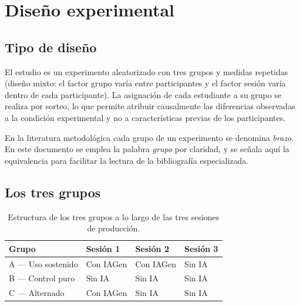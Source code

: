 \documentclass[12pt,a4paper,openany]{report}
\begin{document}
    \chapter{Dise\~no experimental}
    \label{cap:diseno}
    
    \section{Tipo de dise\~no}
    
    El estudio es un experimento aleatorizado con tres grupos y medidas repetidas (dise\~no mixto: el factor grupo var\'ia entre participantes y el factor sesi\'on var\'ia dentro de cada participante). La asignaci\'on de cada estudiante a su grupo se realiza por sorteo, lo que permite atribuir causalmente las diferencias observadas a la condici\'on experimental y no a caracter\'isticas previas de los participantes.
    
    En la literatura metodol\'ogica cada grupo de un experimento se denomina \emph{brazo}. En este documento se emplea la palabra \emph{grupo} por claridad, y se se\~nala aqu\'i la equivalencia para facilitar la lectura de la bibliograf\'ia especializada.
    
    \section{Los tres grupos}
    
    \begin{table}[htbp]
        \centering
        \caption{Estructura de los tres grupos a lo largo de las tres sesiones de producci\'on.}
        \label{tab:grupos}
        \small
        \begin{tabular}{L{3.4cm} C{2.7cm} C{2.7cm} C{2.7cm}}
            \toprule
            \textbf{Grupo} & \textbf{Sesi\'on 1} & \textbf{Sesi\'on 2} & \textbf{Sesi\'on 3} \\
            \midrule
            A --- Uso sostenido & Con IAGen & Con IAGen & Sin IA \\
            B --- Control puro  & Sin IA    & Sin IA    & Sin IA \\
            C --- Alternado     & Con IAGen & Sin IA    & Sin IA \\
            \bottomrule
        \end{tabular}
    \end{table}
    
\end{document}
